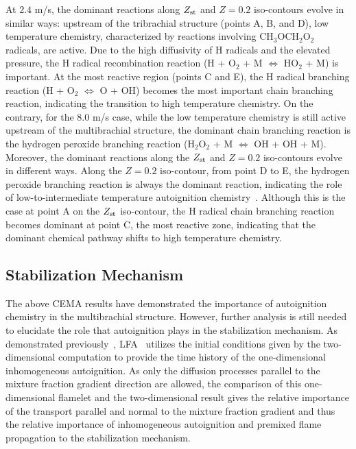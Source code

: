\documentclass[review,3p,times]{elsarticle}
\begin{document}
At $2.4$ m/s, the dominant reactions along $Z_{\rm st}$ and $Z = 0.2$ iso-contours evolve in similar ways: upstream of the tribrachial structure (points A, B, and D), low temperature chemistry, characterized by reactions involving CH$_3$OCH$_2$O$_2$ radicals, are active.  Due to the high diffusivity of H radicals and the elevated pressure, the H radical recombination reaction (H + O$_2$ + M $\Longleftrightarrow$ HO$_2$ + M) is important.  At the most reactive region (points C and E), the H radical branching reaction (H + O$_2$ $\Longleftrightarrow$ O + OH) becomes the most important chain branching reaction, indicating the transition to high temperature chemistry.  On the contrary, for the $8.0$ m/s case, while the low temperature chemistry is still active upstream of the multibrachial structure, the dominant chain branching reaction is the hydrogen peroxide branching reaction (H$_2$O$_2$ + M $\Longleftrightarrow$ OH + OH + M).  Moreover, the dominant reactions along the $Z_{\rm st}$ and $Z = 0.2$ iso-contours evolve in different ways.  Along the $Z = 0.2$ iso-contour, from point D to E, the hydrogen peroxide branching reaction is always the dominant reaction, indicating the role of low-to-intermediate temperature autoignition chemistry~\cite{westbrook00}.  Although this is the case at point A on the $Z_{\rm st}$ iso-contour, the H radical chain branching reaction becomes dominant at point C, the most reactive zone, indicating that the dominant chemical pathway shifts to high temperature chemistry.   

\subsection{Stabilization Mechanism} 
The above CEMA results have demonstrated the importance of autoignition chemistry in the multibrachial structure.  However, further analysis is still needed to elucidate the role that autoignition plays in the stabilization mechanism.  As demonstrated previously~\cite{deng15}, LFA~\cite{pitsch98a} utilizes the initial conditions given by the two-dimensional computation to provide the time history of the one-dimensional inhomogeneous autoignition.  As only the diffusion processes parallel to the mixture fraction gradient direction are allowed, the comparison of this one-dimensional flamelet and the two-dimensional result gives the relative importance of the transport parallel and normal to the mixture fraction gradient and thus the relative importance of inhomogeneous autoignition and premixed flame propagation to the stabilization mechanism.
\end{document}
